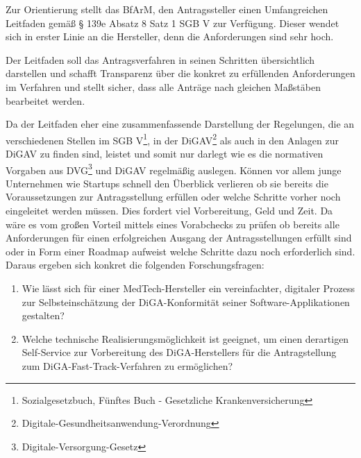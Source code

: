 Zur Orientierung stellt das BfArM, den Antragssteller einen Umfangreichen Leitfaden gemäß § 139e Absatz 8 Satz 1 SGB V zur Verfügung. Dieser wendet sich in erster Linie an die Hersteller, denn die Anforderungen sind sehr hoch.

Der Leitfaden soll das Antragsverfahren in seinen Schritten übersichtlich darstellen und schafft Transparenz über die konkret zu erfüllenden Anforderungen im Verfahren und stellt sicher, dass alle Anträge nach gleichen Maßstäben bearbeitet werden.

Da der Leitfaden eher eine zusammenfassende Darstellung der
Regelungen, die an verschiedenen Stellen im SGB V\footnote{Sozialgesetzbuch, Fünftes Buch - Gesetzliche Krankenversicherung\label{ftn:sgb}}, in der DiGAV\footnote{Digitale-Gesundheitsanwendung-Verordnung\label{ftn:digav}} als auch in den Anlagen zur DiGAV zu finden sind, leistet und somit nur darlegt wie es die normativen Vorgaben aus DVG\footnote{Digitale-Versorgung-Gesetz\label{ftn:dvg}} und DiGAV regelmäßig auslegen.
Können vor allem junge Unternehmen wie Startups schnell den Überblick verlieren ob sie bereits die Voraussetzungen zur Antragsstellung erfüllen oder welche Schritte vorher noch eingeleitet werden müssen. Dies fordert viel Vorbereitung, Geld und Zeit. Da wäre es vom großen Vorteil mittels eines Vorabchecks zu prüfen ob bereits alle Anforderungen für einen erfolgreichen Ausgang der Antragsstellungen erfüllt sind oder in Form einer Roadmap aufweist welche Schritte dazu noch erforderlich sind. Daraus ergeben sich konkret die folgenden Forschungsfragen:

\begin{enumerate}
         \item Wie lässt sich für einer MedTech-Hersteller ein vereinfachter, digitaler Prozess zur Selbsteinschätzung der DiGA-Konformität seiner Software-Applikationen gestalten?
         \item Welche technische Realisierungsmöglichkeit ist geeignet, um einen derartigen Self-Service zur Vorbereitung des DiGA-Herstellers für die Antragstellung zum DiGA-Fast-Track-Verfahren zu ermöglichen?
\end{enumerate}

